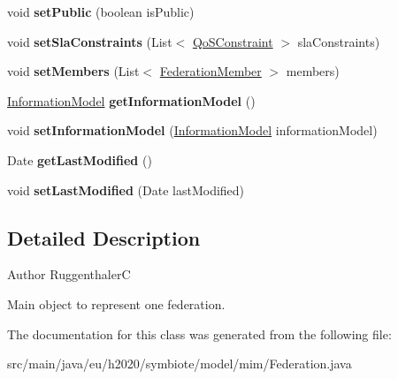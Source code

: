 \begin{DoxyCompactItemize}
void {\bfseries set\+Public} (boolean is\+Public)
\item 
\mbox{\label{classeu_1_1h2020_1_1symbiote_1_1model_1_1mim_1_1Federation_a413ab2b1a5cfeac5de187462e6d94ca0}} 
void {\bfseries set\+Sla\+Constraints} (List$<$ \hyperlink{classeu_1_1h2020_1_1symbiote_1_1model_1_1mim_1_1QoSConstraint}{Qo\+S\+Constraint} $>$ sla\+Constraints)
\item 
\mbox{\label{classeu_1_1h2020_1_1symbiote_1_1model_1_1mim_1_1Federation_a6eacab73ed3e6f9781ec1ed5eb286972}} 
void {\bfseries set\+Members} (List$<$ \hyperlink{classeu_1_1h2020_1_1symbiote_1_1model_1_1mim_1_1FederationMember}{Federation\+Member} $>$ members)
\item 
\mbox{\label{classeu_1_1h2020_1_1symbiote_1_1model_1_1mim_1_1Federation_a90b702b6c32e62d1df4f41e94078c637}} 
\hyperlink{classeu_1_1h2020_1_1symbiote_1_1model_1_1mim_1_1InformationModel}{Information\+Model} {\bfseries get\+Information\+Model} ()
\item 
\mbox{\label{classeu_1_1h2020_1_1symbiote_1_1model_1_1mim_1_1Federation_ac456d292c1a6689da4847d6da8f73aef}} 
void {\bfseries set\+Information\+Model} (\hyperlink{classeu_1_1h2020_1_1symbiote_1_1model_1_1mim_1_1InformationModel}{Information\+Model} information\+Model)
\item 
\mbox{\label{classeu_1_1h2020_1_1symbiote_1_1model_1_1mim_1_1Federation_a79b79b54e128a084b8f0fe6d4de8b1ae}} 
Date {\bfseries get\+Last\+Modified} ()
\item 
\mbox{\label{classeu_1_1h2020_1_1symbiote_1_1model_1_1mim_1_1Federation_a2f723e9b9f7dedd9299966da4ae29514}} 
void {\bfseries set\+Last\+Modified} (Date last\+Modified)
\end{DoxyCompactItemize}


\subsection{Detailed Description}
\begin{DoxyAuthor}{Author}
RuggenthalerC \begin{DoxyVerb}    Main object to represent one federation.\end{DoxyVerb}
 
\end{DoxyAuthor}


The documentation for this class was generated from the following file\+:\begin{DoxyCompactItemize}
\item 
src/main/java/eu/h2020/symbiote/model/mim/Federation.\+java\end{DoxyCompactItemize}
